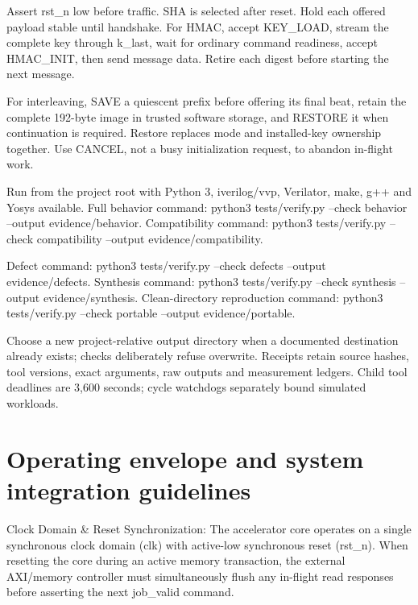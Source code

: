 \documentclass[11pt,a4paper]{article}
\begin{document}
Assert rst\_\allowbreak{}n low before traffic. SHA is selected after reset. Hold each offered payload stable until handshake. For HMAC,\allowbreak{} accept KEY\_\allowbreak{}LOAD,\allowbreak{} stream the complete key through k\_\allowbreak{}last,\allowbreak{} wait for ordinary command readiness,\allowbreak{} accept HMAC\_\allowbreak{}INIT,\allowbreak{} then send message data. Retire each digest before starting the next message.


For interleaving,\allowbreak{} SAVE a quiescent prefix before offering its final beat,\allowbreak{} retain the complete 192-byte image in trusted software storage,\allowbreak{} and RESTORE it when continuation is required. Restore replaces mode and installed-key ownership together. Use CANCEL,\allowbreak{} not a busy initialization request,\allowbreak{} to abandon in-flight work.


Run from the project root with Python 3,\allowbreak{} iverilog/\allowbreak{}vvp,\allowbreak{} Verilator,\allowbreak{} make,\allowbreak{} g+\allowbreak{}+\allowbreak{} and Yosys available. Full behavior command: python3 tests/\allowbreak{}verify.py --check behavior --output evidence/\allowbreak{}behavior. Compatibility command: python3 tests/\allowbreak{}verify.py --check compatibility --output evidence/\allowbreak{}compatibility.


Defect command: python3 tests/\allowbreak{}verify.py --check defects --output evidence/\allowbreak{}defects. Synthesis command: python3 tests/\allowbreak{}verify.py --check synthesis --output evidence/\allowbreak{}synthesis. Clean-directory reproduction command: python3 tests/\allowbreak{}verify.py --check portable --output evidence/\allowbreak{}portable.


Choose a new project-relative output directory when a documented destination already exists; checks deliberately refuse overwrite. Receipts retain source hashes,\allowbreak{} tool versions,\allowbreak{} exact arguments,\allowbreak{} raw outputs and measurement ledgers. Child tool deadlines are 3,\allowbreak{}600 seconds; cycle watchdogs separately bound simulated workloads.


\section{Operating envelope and system integration guidelines}

Clock Domain \& Reset Synchronization: The accelerator core operates on a single synchronous clock domain (\allowbreak{}clk)\allowbreak{} with active-low synchronous reset (\allowbreak{}rst\_\allowbreak{}n)\allowbreak{}. When resetting the core during an active memory transaction,\allowbreak{} the external AXI/\allowbreak{}memory controller must simultaneously flush any in-flight read responses before asserting the next job\_\allowbreak{}valid command.
\end{document}
